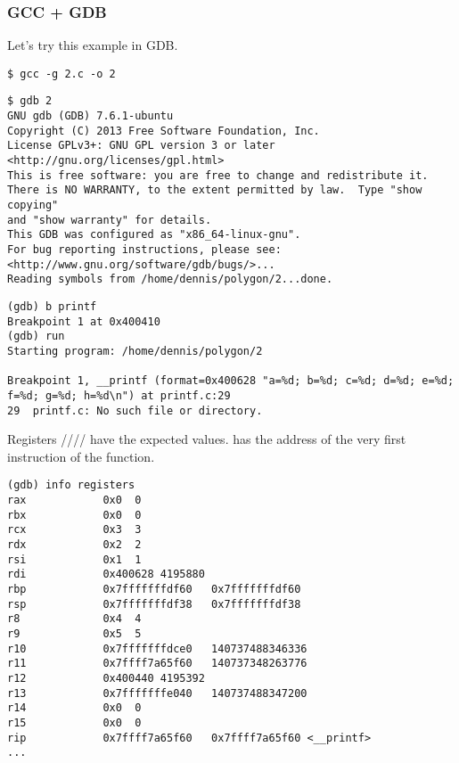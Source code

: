 

\ifdefined\IncludeGDB
\subsubsection{GCC + GDB}

Let's try this example in \ac{GDB}.

\begin{lstlisting}
$ gcc -g 2.c -o 2
\end{lstlisting}

\begin{lstlisting}
$ gdb 2
GNU gdb (GDB) 7.6.1-ubuntu
Copyright (C) 2013 Free Software Foundation, Inc.
License GPLv3+: GNU GPL version 3 or later <http://gnu.org/licenses/gpl.html>
This is free software: you are free to change and redistribute it.
There is NO WARRANTY, to the extent permitted by law.  Type "show copying"
and "show warranty" for details.
This GDB was configured as "x86_64-linux-gnu".
For bug reporting instructions, please see:
<http://www.gnu.org/software/gdb/bugs/>...
Reading symbols from /home/dennis/polygon/2...done.
\end{lstlisting}

\begin{lstlisting}[caption=let's set the breakpoint to \printf{,} and run]
(gdb) b printf
Breakpoint 1 at 0x400410
(gdb) run
Starting program: /home/dennis/polygon/2 

Breakpoint 1, __printf (format=0x400628 "a=%d; b=%d; c=%d; d=%d; e=%d; f=%d; g=%d; h=%d\n") at printf.c:29
29	printf.c: No such file or directory.
\end{lstlisting}

Registers \RSI/\RDX/\RCX// have the expected values.
\RIP has the address of the very first instruction of the \printf function.

\begin{lstlisting}
(gdb) info registers
rax            0x0	0
rbx            0x0	0
rcx            0x3	3
rdx            0x2	2
rsi            0x1	1
rdi            0x400628	4195880
rbp            0x7fffffffdf60	0x7fffffffdf60
rsp            0x7fffffffdf38	0x7fffffffdf38
r8             0x4	4
r9             0x5	5
r10            0x7fffffffdce0	140737488346336
r11            0x7ffff7a65f60	140737348263776
r12            0x400440	4195392
r13            0x7fffffffe040	140737488347200
r14            0x0	0
r15            0x0	0
rip            0x7ffff7a65f60	0x7ffff7a65f60 <__printf>
...
\end{lstlisting}

